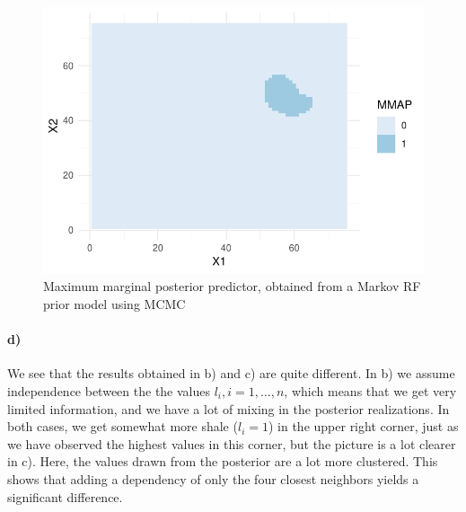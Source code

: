 \begin{figure}
    \centering
    \includegraphics[scale=0.95]{figures/c_MMAP.pdf}
    \caption{Maximum marginal posterior predictor, obtained from a Markov RF prior model using MCMC}
    \label{fig:MCMC_MMAP}
\end{figure}

\paragraph{d)}

We see that the results obtained in b) and c) are quite different. In b) we assume independence between the the values $l_i, i= 1,\dots,n$, which means that we get very limited information, and we have a lot of mixing in the posterior realizations. In both cases, we get somewhat more shale ($l_i = 1$) in the upper right corner, just as we have observed the highest values in this corner, but the picture is a lot clearer in c). Here, the values drawn from the posterior are a lot more clustered. This shows that adding a dependency of only the four closest neighbors yields a significant difference.

